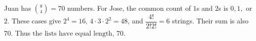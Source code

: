 Juan has $\binom84=70$ numbers. For Jose, the common count of $1$s and $2$s is $0,1,$ or $2$. These cases give $2^4=16$, $4\cdot3\cdot2^2=48$, and $\dfrac{4!}{2!2!}=6$ strings. Their sum is also $70$. Thus $\boxed{\text{the lists have equal length, }70}$.
